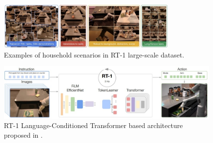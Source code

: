 \begin{figure}[t]
    \centering
    \includegraphics[width=0.8\textwidth]{figures/images/rt_1/dataset_image.jpg}
    \caption{Examples of household scenarios in RT-1 large-scale dataset.}
    \label{fig:rt_1_dataset}
\end{figure}

\begin{figure}[t]
    \centering
    \includegraphics[width=\textwidth]{figures/images/rt_1/model.jpg}
    \caption{RT-1 Language-Conditioned Transformer based architecture proposed in \cite{brohan2022rt}.}
    \label{fig:rt_1_model}
\end{figure}